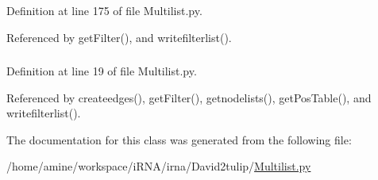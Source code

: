 \-Definition at line 175 of file \-Multilist.\-py.



\-Referenced by get\-Filter(), and writefilterlist().

\hypertarget{classirna_1_1David2tulip_1_1Multilist_1_1Multilist_a4d9d717733e5da6403c69397afa4eb10}{
\subsubsection[{multilist\-\_\-file}]{}}
\label{classirna_1_1David2tulip_1_1Multilist_1_1Multilist_a4d9d717733e5da6403c69397afa4eb10}


\-Definition at line 19 of file \-Multilist.\-py.



\-Referenced by createedges(), get\-Filter(), getnodelists(), get\-Pos\-Table(), and writefilterlist().



\-The documentation for this class was generated from the following file\-:\begin{DoxyCompactItemize}
\item 
/home/amine/workspace/i\-R\-N\-A/irna/\-David2tulip/\hyperlink{Multilist_8py}{\-Multilist.\-py}\end{DoxyCompactItemize}
